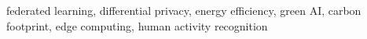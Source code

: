 \documentclass[conference]{IEEEtran}
\begin{document}
\begin{IEEEkeywords}
federated learning, differential privacy, energy efficiency, green AI, carbon
footprint, edge computing, human activity recognition
\end{IEEEkeywords}













\end{document}
